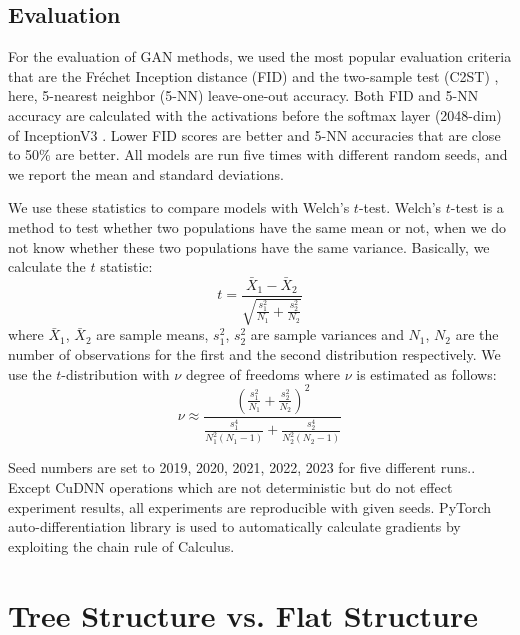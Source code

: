 \documentclass[a4paper,onesided,12pt]{report}
\begin{document}
\subsection{Evaluation}
\label{subsec:eval}
For the evaluation of GAN methods, we used the most popular evaluation criteria that are the Fr\'echet Inception distance (FID) \cite{heusel2017gans} and the two-sample test (C2ST) \cite{lopez2016revisiting}, here, 5-nearest neighbor (5-NN) leave-one-out accuracy. Both FID and 5-NN accuracy are calculated with the activations before the softmax layer (2048-dim) of InceptionV3 \cite{szegedy2016rethinking}. Lower FID scores are better and 5-NN accuracies that are close to 50\% are better. All models are run five times with different random seeds, and we report the mean and standard deviations.

We use these statistics to compare models with Welch's $t$-test. Welch's $t$-test is a method to test whether two populations have the same mean or not, when we do not know whether these two populations have the same variance. Basically, we calculate the $t$ statistic:
\begin{equation}
t = \frac{\bar{X}_1-\bar{X}_2}{\sqrt{\frac{s_1^2}{N_1} + \frac{s_2^2}{N_2}}}
\label{eq:tstat}
\end{equation}
where $\bar{X}_1$, $\bar{X}_2$ are sample means, $s_1^2$, $s_2^2$ are sample variances and $N_1$, $N_2$ are the number of observations for the first and the second distribution respectively. We use the $t$-distribution with $\nu$ degree of freedoms where $\nu$ is estimated as follows:
\begin{equation}
\nu \approx \frac{\left(\frac{s_1^2}{N_1} + \frac{s_2^2}{N_2}\right)^2}{\frac{s_1^4}{N_1^2(N_1-1)}+\frac{s_2^4}{N_2^2(N_2-1)}}
\label{eq:dof}
\end{equation}

Seed numbers are set to {2019, 2020, 2021, 2022, 2023} for five different runs.. Except CuDNN \cite{chetlur2014cudnn} operations which are not deterministic but do not effect experiment results, all experiments are reproducible with given seeds. PyTorch auto-differentiation library \cite{paszke2017automatic} is used to automatically calculate gradients by exploiting the chain rule of Calculus. 

\section{Tree Structure vs. Flat Structure}
\label{sec:hme-vs-me}
\end{document}
